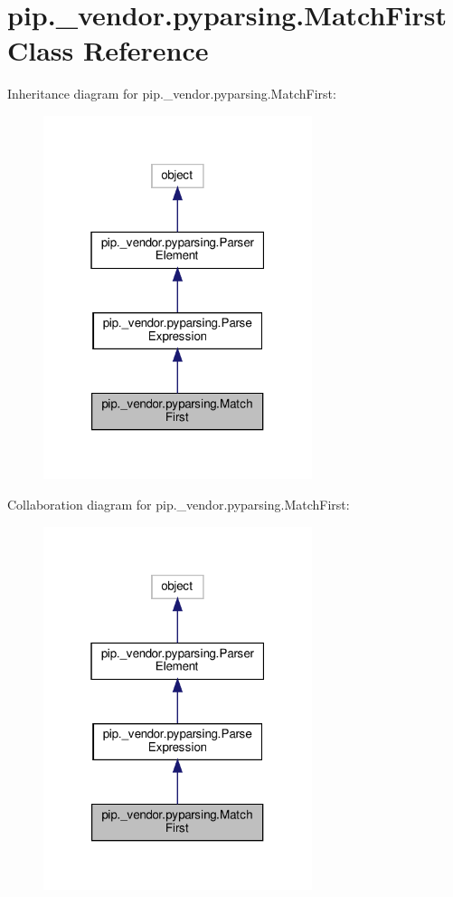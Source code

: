 \hypertarget{classpip_1_1__vendor_1_1pyparsing_1_1MatchFirst}{}\section{pip.\+\_\+vendor.\+pyparsing.\+Match\+First Class Reference}
\label{classpip_1_1__vendor_1_1pyparsing_1_1MatchFirst}


Inheritance diagram for pip.\+\_\+vendor.\+pyparsing.\+Match\+First\+:
\nopagebreak
\begin{figure}[H]
\begin{center}
\leavevmode
\includegraphics[width=223pt]{classpip_1_1__vendor_1_1pyparsing_1_1MatchFirst__inherit__graph}
\end{center}
\end{figure}


Collaboration diagram for pip.\+\_\+vendor.\+pyparsing.\+Match\+First\+:
\nopagebreak
\begin{figure}[H]
\begin{center}
\leavevmode
\includegraphics[width=223pt]{classpip_1_1__vendor_1_1pyparsing_1_1MatchFirst__coll__graph}
\end{center}
\end{figure}
